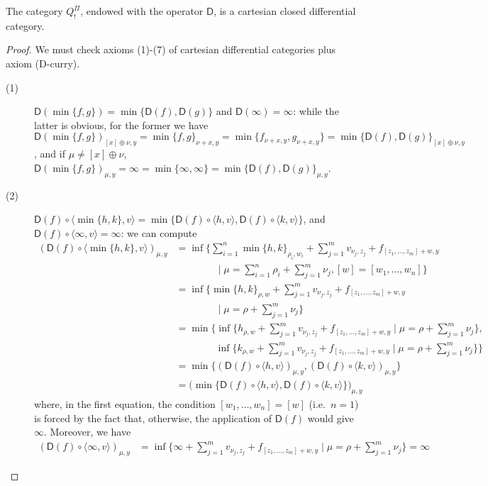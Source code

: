 \begin{proposition}
The category $Q^{\Pi}_{!}$, endowed with the operator $\mathsf D$, is a cartesian closed differential category.
\end{proposition}
\begin{proof}
We must check axioms (1)-(7) of cartesian differential categories plus axiom (D-curry).
\begin{description}
\item[(1)] $\mathsf D(\min\{f,g\})=\min \{\mathsf D(f),\mathsf D(g)\}$ and $\mathsf D(\infty)=\infty$: 
while the latter is obvious, for the former we have 
$\mathsf D(\min\{f,g\})_{[x]\oplus\nu,y}= \min\{f,g\}_{\nu+x,y}= \min\{f_{\nu+x,y},g_{\nu+x,y}\}=\min\{\mathsf D(f),\mathsf D(g)\}_{[x]\oplus \nu,y}$, and if $\mu\neq [x]\oplus \nu$, 
$\mathsf D(\min\{f,g\})_{\mu,y}= \infty= \min\{\infty, \infty\}=\min\{ \mathsf D(f),\mathsf D(g)\}_{\mu,y}$. 
\item[(2)]
$\mathsf D(f)\circ \langle \min\{h,k\},v\rangle= \min\{ \mathsf D(f)\circ \langle h,v\rangle, \mathsf D(f)\circ \langle k,v\rangle\}$, and $\mathsf D(f)\circ \langle \infty,v\rangle=\infty$: we can compute
	\begin{align*}
	(\mathsf D(f)\circ \langle \min\{h,k\},v\rangle)_{\mu,y}&=
	\inf\Big\{ 
	\sum_{i=1}^{n}\min\{h,k\}_{\rho_{i},w_{i}}+
	\sum_{j=1}^{m}v_{\nu_{j},z_{j}}
	+
	f_{[z_{1},\dots, z_{m}]+w,y}\\
&	\qquad\qquad\mid
	\mu=\sum_{i=1}^{n}\rho_{i}+\sum_{j=1}^{m}\nu_{j},	[w]=[w_{1},\dots, w_{n}]
	\Big\}\\
	& 
=	\inf\Big\{ 
	\min\{h,k\}_{\rho,w}+
	\sum_{j=1}^{m}v_{\nu_{j},z_{j}}
	+
	f_{[z_{1},\dots, z_{m}]+w,y}\\
&	\qquad\qquad\mid
	\mu=\rho+\sum_{j=1}^{m}\nu_{j}
	\Big\}\\
	&=	\min\Big\{\inf\big\{ 
	h_{\rho,w}+
	\sum_{j=1}^{m}v_{\nu_{j},z_{j}}
	+
	f_{[z_{1},\dots, z_{m}]+w,y}	\mid
	\mu=\rho+\sum_{j=1}^{m}\nu_{j}\big\}, \\
	& \qquad\qquad \inf\big\{ 
	k_{\rho,w}+
	\sum_{j=1}^{m}v_{\nu_{j},z_{j}}
	+
	f_{[z_{1},\dots, z_{m}]+w,y}	\mid
	\mu=\rho+\sum_{j=1}^{m}\nu_{j}\big\}\Big\}\\
	& = \min\Big\{(\mathsf D(f)\circ \langle h,v\rangle)_{\mu,y}, (\mathsf D(f)\circ \langle k,v\rangle)_{\mu,y}\Big\}\\
		& = \Big(\min\big\{\mathsf D(f)\circ \langle h,v\rangle, \mathsf D(f)\circ \langle k,v\rangle\big\}\Big )_{\mu,y}
	\end{align*}
	where, in the first equation, the condition $[w_{1},\dots, w_{n}]=[w]$ (i.e.~$n=1$) is forced by the fact that, otherwise, the application of $\mathsf D(f)$ would give $\infty$. Moreover, we have
\begin{align*}
(\mathsf D(f) \circ \langle \infty, v\rangle)_{\mu,y}&=\inf\Big\{ 
	\infty+
	\sum_{j=1}^{m}v_{\nu_{j},z_{j}}
	+
	f_{[z_{1},\dots, z_{m}]+w,y}\mid
	\mu=\rho+\sum_{j=1}^{m}\nu_{j}
	\Big\} = \infty
\end{align*}


\end{description}
\end{proof}
